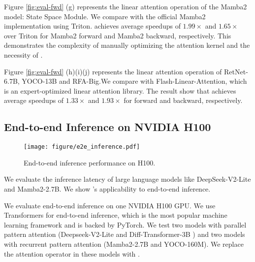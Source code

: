 Figure \ref{fig:eval-fwd} (g) represents the linear attention operation of the Mamba2 model: State Space Module. We compare \oursys{} with the official Mamba2 implementation using Triton. 
\oursys{} achieves average speedups of $1.99\times$ and $1.65\times$ over Triton for Mamba2 forward and Mamba2 backward, respectively. This demonstrates the complexity of manually optimizing the attention kernel and the necessity of \oursys{}.

Figure \ref{fig:eval-fwd} (h)(i)(j) represents the linear attention operation of RetNet-6.7B, YOCO-13B and RFA-Big.We compare \oursys{} with Flash-Linear-Attention, which is an expert-optimized linear attention library. The result show that \oursys{} achieves average speedups of $1.33\times$ and $1.93\times$ for forward and backward, respectively.


\subsection{End-to-end Inference on NVIDIA H100}

\begin{figure}[t]
    \centering
    \texttt{[image: figure/e2e\_inference.pdf]}
    \vspace{-5mm}
    \caption{End-to-end inference performance on H100.}
    \vspace{-5mm}
    \label{fig:end-to-end inference}
\end{figure}

We evaluate the inference latency of large language models like DeepSeek-V2-Lite and Mamba2-2.7B. We show \oursys{}'s applicability to end-to-end inference.

 We evaluate end-to-end inference on one NVIDIA H100 GPU. We use Transformers\cite{wolf-etal-2020-transformers} for end-to-end inference, which is the most popular machine learning framework and is backed by PyTorch. We test two models with parallel pattern attention (Deepseek-V2-Lite and Diff-Transformer-3B ) and two models with recurrent pattern attention (Mamba2-2.7B and YOCO-160M).  We replace the attention operator in these models with \oursys{}.


